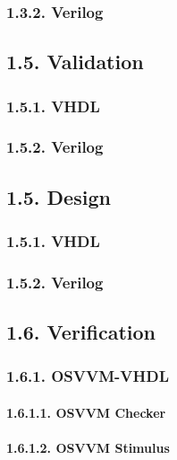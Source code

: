 \documentclass[]{article}
\let\oldparagraph\paragraph
\renewcommand{\paragraph}[1]{\oldparagraph{#1}\mbox{}}
\begin{document}
\subsubsection{1.3.2. Verilog}\label{verilog}

\subsection{1.5. Validation}\label{validation}

\subsubsection{1.5.1. VHDL}\label{vhdl-1}

\subsubsection{1.5.2. Verilog}\label{verilog-1}

\subsection{1.5. Design}\label{design}

\subsubsection{1.5.1. VHDL}\label{vhdl-2}

\subsubsection{1.5.2. Verilog}\label{verilog-2}

\subsection{1.6. Verification}\label{verification}

\subsubsection{1.6.1. OSVVM-VHDL}\label{osvvm-vhdl}

\paragraph{1.6.1.1. OSVVM Checker}\label{osvvm-checker}

\paragraph{1.6.1.2. OSVVM Stimulus}\label{osvvm-stimulus}
\end{document}
